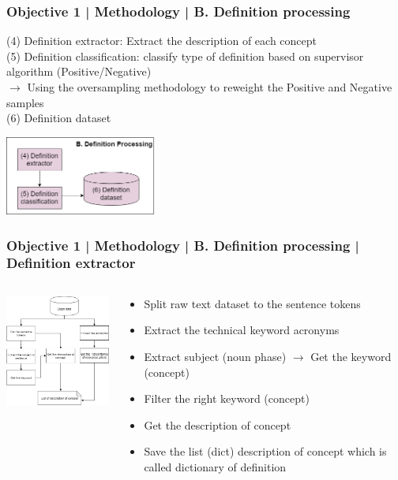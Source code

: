 \documentclass{beamer}
\begin{document}
\begin{frame}
\frametitle{Objective 1 | Methodology | B. Definition processing}
(4) Definition extractor: Extract the description of each concept\\
(5) Definition classification: classify type of definition based on supervisor algorithm (Positive/Negative)\\
$\rightarrow$ Using the oversampling methodology to reweight the Positive and Negative samples\\
(6) Definition dataset
\begin{center}
		\includegraphics[width=50mm]{223.png}
\end{center}
\end{frame}
\begin{frame}
\frametitle{Objective 1 | Methodology | B. Definition processing | Definition extractor}
\begin{columns}
		\begin{column}{.5\textwidth}
		\includegraphics[width=50mm]{df12121.png}
	\end{column}
	\begin{column}{.65\textwidth}
		
		\begin{itemize}
			\item Split raw text dataset to the sentence tokens
			\item Extract the technical keyword acronyms
			\item Extract subject (noun phase) $\rightarrow$ Get the keyword (concept)
			\item Filter the right keyword (concept)
			\item Get the description of concept
			\item Save the list (dict) description of concept which is called dictionary of definition
		\end{itemize}
	\end{column}

	
\end{columns}
\end{frame}
\end{document}
